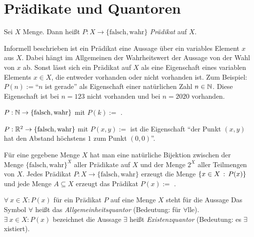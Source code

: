 \section{Prädikate und Quantoren}


\begin{defn}
Sei $ X $ Menge. Dann heißt $ P : X \to \{ \text{falsch},\text{wahr} \} $ \emph{Prädikat} auf $ X $. 
\end{defn} 

\begin{bem}
	Informell beschrieben ist ein Prädikat eine Aussage über ein variables Element $x$ aus $X$. Dabei hängt im Allgemeinen der Wahrheitswert der Aussage von der Wahl von $x$ ab.  Sonst lässt sich ein Prädikat auf $X$ als eine Eigenschaft eines variablen Elements $x \in X$, die entweder vorhanden oder nicht vorhanden ist. Zum Beispiel: $P(n):=$``$n$ ist gerade'' als Eigenschaft einer natürlichen Zahl $n \in \mathbb{N}$. Diese Eigenschaft ist bei $n=123$ nicht vorhanden und bei $n=2020$ vorhanden. 
\end{bem}

\begin{bsp}
$ P : \mathbb{N} \to \{ \text{falsch},\text{wahr} \}$ mit $P(k) := $ .
\end{bsp} 

\begin{bsp}
$ P : \mathbb{R}^2 \to \{ \text{falsch},\text{wahr} \}$ mit $P(x,y) := $  ist die Eigenschaft  ``der Punkt $(x,y)$ hat den Abstand höchstens $1$ zum Punkt $(0,0)$''. 
\end{bsp} 

\begin{bem} 
	Für eine gegebene Menge $X$ hat man eine natürliche Bijektion zwischen der Menge $ \{ \text{falsch},\text{wahr} \}^X$ aller Prädikate auf $X$ und der Menge $2^X$ aller Teilmengen von $X$. Jedes Prädikat $P : X \to \{ \text{falsch},\text{wahr} \}$ erzeugt die Menge $\left\{ x \in X  \,:\, P(x) \right\}$ und jede Menge $A \subseteq X$ erzeugt das Prädikat $P (x) :=$ .
\end{bem} 


\begin{defn}
$ \forall\: x \in X : P(x) $ für ein Prädikat $ P $ auf eine Menge $ X $ steht für die Aussage  Das Symbol $ \forall $ heißt das \emph{Allgemeinheitsquantor} (Bedeutung: für $ \forall $lle). \\[10pt]
%
$ \exists\: x \in X : P(x) $ bezeichnet die Aussage  $ \exists $ heißt \emph{Existenzquantor} (Bedeutung: es $ \exists $xistiert).
\end{defn}

